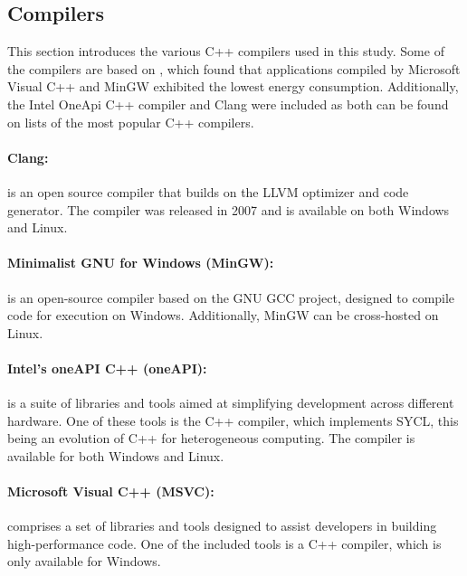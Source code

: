 \subsection{Compilers}

This section introduces the various C++ compilers used in this study. Some of the compilers are based on \cite{hassan2017}, which found that applications compiled by Microsoft Visual C++ and MinGW exhibited the lowest energy consumption. Additionally, the Intel OneApi C++ compiler and Clang were included as both can be found on lists of the most popular C++ compilers\cite{mycplus, educba, softwaretestinghelp}. 



\paragraph{Clang:} is an open source compiler that builds on the LLVM optimizer and code generator. The compiler was released in 2007 and is available on both Windows and Linux.\cite{clang}

\paragraph*{Minimalist GNU for Windows (MinGW):} is an open-source compiler based on the GNU GCC project, designed to compile code for execution on Windows. Additionally, MinGW can be cross-hosted on Linux.\cite{mingw}

\paragraph*{Intel's oneAPI C++ (oneAPI):}  is a suite of libraries and tools aimed at simplifying development across different hardware. One of these tools is the C++ compiler, which implements SYCL, this being an evolution of C++ for heterogeneous computing. The compiler is available for both Windows and Linux.\cite{oneapi}

\paragraph*{Microsoft Visual C++ (MSVC):}  comprises a set of libraries and tools designed to assist developers in building high-performance code. One of the included tools is a C++ compiler, which is only available for Windows\cite{msvc}.
